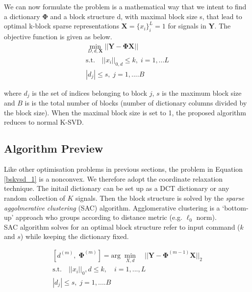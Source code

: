 We can now formulate the problem is a mathematical way that we intent to find a dictionary $\mathbf{\Phi}$ and a block structure d, with maximal block size s, that lead to optimal k-block sparse representations $\mathbf{X} = \{x_i\}^L_i=1 $ for signals in $\mathbf{Y}$. The objective function is given as below.\\
\begin{equation}
\begin{aligned} 
    \min_{D,d,\mathbf{X}} ||\mathbf{Y} -\mathbf{\Phi}\mathbf{X}||\\
    \text{s.t.} \quad ||x_i||_{0,d} \leq k, \; i = 1,...L\\
    |d_j| \leq s, \; j = 1,....B
    \label{bskvsd_1}
\end{aligned}
\end{equation}

where $d_j$ is the set of indices belonging to block $j$, $s$ is the maximum block size and $B$ is
is the total number of blocks (number of dictionary columns divided by the block size). When the maximal block size is set to 1, the proposed algorithm reduces to normal K-SVD.\\


\subsection{Algorithm Preview}
Like other optimisation problems in previous sections, the problem in Equation \ref{bskvsd_1} is a nonconvex. We therefore adopt the coordinate relaxation technique. The initail dictionary can be set up as a DCT dictionary or any random collection of $K$ signals. Then the block structure is solved by the \textit{sparse aggolmerative clustering} (SAC) algorithm\cite{Johnson1967}. Agglomerative clustering is a `bottom-up' approach who groups according to distance metric (e.g. $\ell_0$ norm).\\

SAC algorithm solves for an optimal block structure refer to input command ($k$ and $s$) while keeping the dictionary fixed.

\begin{equation}
\begin{aligned}
    \left[d^{(m)}, \;\mathbf{\Phi}^{(m)}\right] = \text{arg} \; \min_{X,d} \quad || \mathbf{Y} - \mathbf{\Phi}^{(m-1)}\mathbf{X}||_2 \\
    \text{s.t.} \quad ||x_i||_0,d \leq k, \quad i = 1,...,L\\
    |d_j| \leq s, \; j = 1,....B
\end{aligned}
\end{equation}

